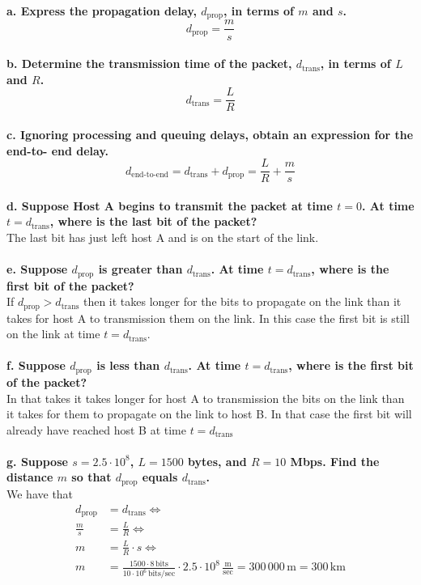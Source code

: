 \textbf{a. Express the propagation delay, $d_{\text{prop}}$, in terms of $m$ and $s$.} \\
\begin{equation*}
    d_{\text{prop}} = \frac{m}{s}
\end{equation*}
\\
\textbf{b. Determine the transmission time of the packet, $d_{\text{trans}}$, in terms of $L$ and $R$.} \\
\begin{equation*}
    d_{\text{trans}} = \frac{L}{R}
\end{equation*}
\\
\textbf{c. Ignoring processing and queuing delays, obtain an expression for the end-to-
end delay.} \\
\begin{equation*}
    d_{\text{end-to-end}} = d_{\text{trans}} + d_{\text{prop}} = \frac{L}{R} + \frac{m}{s}
\end{equation*}
\\
\textbf{d. Suppose Host A begins to transmit the packet at time $t = 0$. At time $t =
d_{\text{trans}}$, where is the last bit of the packet?} \\
The last bit has just left host A and is on the start of the link. \\
\\
\textbf{e. Suppose $d_{\text{prop}}$ is greater than $d_{\text{trans}}$. At time $t = d_{\text{trans}}$, where is the first
bit of the packet?} \\
If $d_{\text{prop}} > d_{\text{trans}}$ then it takes longer for the bits to propagate on the link than it takes for host A to transmission them on the link. In this case the first bit is still on the link at time $t = d_{\text{trans}}$. \\
\\
\textbf{f. Suppose $d_{\text{prop}}$ is less than $d_{\text{trans}}$. At time $t = d_{\text{trans}}$, where is the first
bit of the packet?} \\
In that takes it takes longer for host A to transmission the bits on the link than it takes for them to propagate on the link to host B. In that case the first bit will already have reached host B at time $t = d_{\text{trans}}$ \\
\\
\textbf{g. Suppose $s = 2.5 \cdot 10^8$, $L = 1500$ bytes, and $R = 10$ Mbps. Find the
distance $m$ so that $d_{\text{prop}}$ equals $d_{\text{trans}}$.} \\
We have that 
\begin{equation*}
\begin{split}
    d_{\text{prop}} &= d_{\text{trans}} \Longleftrightarrow \\
    \frac{m}{s} &= \frac{L}{R} \Longleftrightarrow \\
    m &= \frac{L}{R} \cdot s \Longleftrightarrow \\
    m &= \frac{1500 \cdot 8 \, \text{bits}}{10 \cdot 10^6\, \text{bits/sec}} \cdot 2.5 \cdot 10^8 \, \frac{\text{m}}{\text{sec}} = 300 \, 000 \, \text{m} = 300 \, \text{km}
\end{split}
\end{equation*}


